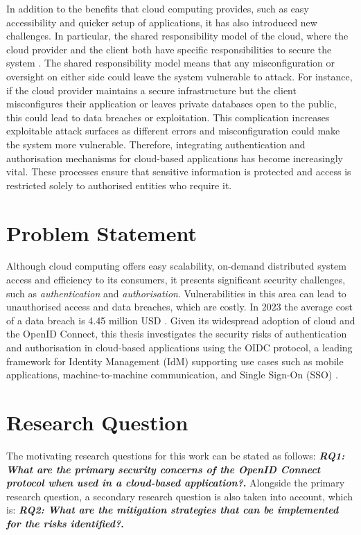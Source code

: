 In addition to the benefits that cloud computing provides, such as easy accessibility and quicker setup of applications, it has also introduced new challenges.
In particular, the shared responsibility model of the cloud, where the cloud provider and the client both have specific responsibilities to secure the system \citep{shared_principal}.
The shared responsibility model means that any misconfiguration or oversight on either side could leave the system vulnerable to attack.
For instance, if the cloud provider maintains a secure infrastructure but the client misconfigures their application or leaves private databases open to the public, this could lead to data breaches or exploitation.
This complication increases exploitable attack surfaces as different errors and misconfiguration could make the system more vulnerable.
Therefore, integrating authentication and authorisation mechanisms for cloud-based applications has become increasingly vital.
These processes ensure that sensitive information is protected and access is restricted solely to authorised entities who require it. \newpage


\section{Problem Statement}
Although cloud computing offers easy scalability, on-demand distributed system access and efficiency to its consumers, it presents significant security challenges, such as \textit{authentication} and \textit{authorisation}.
Vulnerabilities in this area can lead to unauthorised access and data breaches, which are costly.
In 2023 the average cost of a data breach is 4.45 million USD  \citep{statista_data_breach}.
Given its widespread adoption of cloud and the OpenID Connect, this thesis investigates the security risks of authentication and authorisation in cloud-based applications using the OIDC protocol, a leading framework for Identity Management (IdM) supporting use cases such as mobile applications, machine-to-machine communication, and Single Sign-On (SSO)  \citep{oidc_popular}.


\section{Research Question}\label{sec:objectives}
The motivating research questions for this work can be stated as follows: \newline
\textbf{\textit{RQ1: What are the primary security concerns of the OpenID Connect protocol when used in a cloud-based application?}.} \newline 
Alongside the primary research question, a secondary research question is also taken into account, which is: \newline
\textbf{\textit{RQ2: What are the mitigation strategies that can be implemented for the risks identified?}.} 

